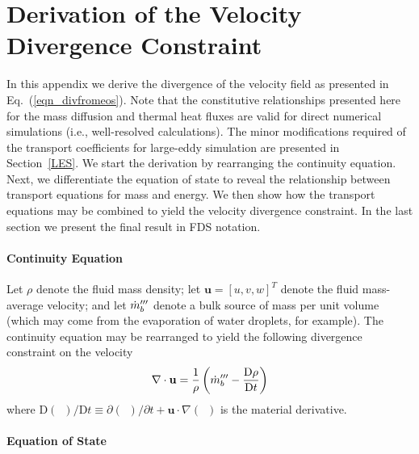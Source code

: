 \chapter{Derivation of the Velocity Divergence Constraint}
\label{app_divergence}

In this appendix we derive the divergence of the velocity field as presented in Eq.~(\ref{eqn_divfromeos}). Note that the constitutive relationships presented here for the mass diffusion and thermal heat fluxes are valid for direct numerical simulations (i.e., well-resolved calculations). The minor modifications required of the transport coefficients for large-eddy simulation are presented in Section~\ref{LES}.  We start the derivation by rearranging the continuity equation. Next, we differentiate the equation of state to reveal the relationship between transport equations for mass and energy. We then show how the transport equations may be combined to yield the velocity divergence constraint.  In the last section we present the final result in FDS notation.

\subsubsection{Continuity Equation}
\label{continuity}

Let $\rho$ denote the fluid mass density; let $\mathbf{u} = [u,v,w]^T$ denote the fluid mass-average velocity; and let $\dot{m}_b^{{\prime\prime\prime}}$
denote a bulk source of mass per unit volume (which may come from the evaporation of water droplets, for example).
The continuity equation may be rearranged to yield the following divergence constraint on the velocity
\begin{equation}
\label{eqn_divconstraint1}
\nabla\cdot \mathbf{u} = \frac{1}{\rho} \left( \dot{m}_b^{{\prime\prime\prime}} -  \frac{\mbox{D} \rho}{\mbox{D} t} \right)
\end{equation}
where $\mbox{D}(\,\,\,)/\mbox{D} t \equiv \partial (\,\,\,)/\partial t + \mathbf{u}\cdot\nabla(\,\,\,)$ is the material derivative.

\subsubsection{Equation of State}
\label{EOS}

